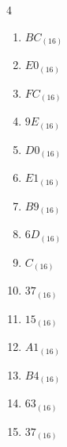 \begin{multicols}{4}
\begin{enumerate}
        \phantom{$=71$}

  \item $BC_{(16)}$

        \phantom{$=188$}

  \item $E0_{(16)}$

        \phantom{$=224$}

  \item $FC_{(16)}$

        \phantom{$=252$}

  \item $9E_{(16)}$

        \phantom{$=158$}

  \item $D0_{(16)}$

        \phantom{$=208$}

  \item $E1_{(16)}$

        \phantom{$=225$}

  \item $B9_{(16)}$

        \phantom{$=185$}

\columnbreak %

\resetques

  \item $6D_{(16)}$

        \phantom{$=109$}

  \item $C_{(16)}$

        \phantom{$=12$}

  \item $37_{(16)}$

        \phantom{$=55$}

  \item $15_{(16)}$

        \phantom{$=21$}

  \item $A1_{(16)}$

        \phantom{$=161$}

  \item $B4_{(16)}$

        \phantom{$=180$}

  \item $63_{(16)}$

        \phantom{$=99$}

  \item $37_{(16)}$


\end{enumerate}
\end{multicols}
